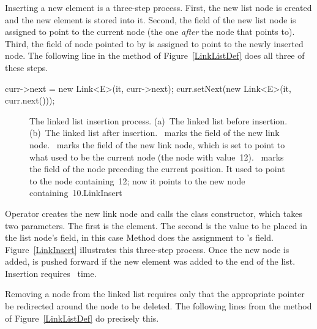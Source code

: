Inserting a new element is a
three-step process.
First, the new list node is created and the new element is
stored into it.
Second, the  field of the new list node is assigned to
point to the current node (the one \emph{after} the node that
 points to).
Third, the  field of node pointed to by 
is assigned to point to the newly inserted node.
The following line in the  method of
Figure~\ref{LinkListDef} does all three of these steps.

\begin{progenv}
{curr->next = new Link<E>(it, curr->next);}{}
{curr.setNext(new Link<E>(it, curr.next()));}{}
\end{progenv}

\begin{figure}
\vspace{-\medskipamount}

{The linked list insertion process.
(a)~The linked list before insertion.
(b)~The linked list after insertion.
~marks the  field of the new link node.
~marks the  field of the new link node, which
is set to point to what used to be the current node
(the node with value~12).
~marks the  field of the node preceding the current
position.
It used to point to the node containing~12; now it points to the new
node containing~10.}{LinkInsert}
\bigskip
\end{figure}

\noindent Operator  creates the new link node
and calls the  class constructor,
which takes two parameters.
The first is the element.
The second is the value to be placed in the list node's  field,
in this
case
{Method  does the assignment to 's
 field.}{}
Figure~\ref{LinkInsert} illustrates this three-step process.
Once the new node is added,  is pushed forward if the new
element was added to the end of the list.
Insertion requires \Thetaone\ time.

Removing a node from the linked list requires only that
the appropriate pointer be redirected around the node to be deleted.
The following lines from the  method of
Figure~\ref{LinkListDef} do precisely this.
\medskip

